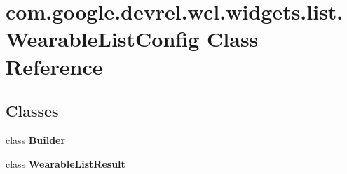 \hypertarget{classcom_1_1google_1_1devrel_1_1wcl_1_1widgets_1_1list_1_1WearableListConfig}{}\section{com.\+google.\+devrel.\+wcl.\+widgets.\+list.\+Wearable\+List\+Config Class Reference}
\label{classcom_1_1google_1_1devrel_1_1wcl_1_1widgets_1_1list_1_1WearableListConfig}
\subsection*{Classes}
\begin{DoxyCompactItemize}
\item 
class {\bfseries Builder}
\item 
class {\bfseries Wearable\+List\+Result}
\end{DoxyCompactItemize}
